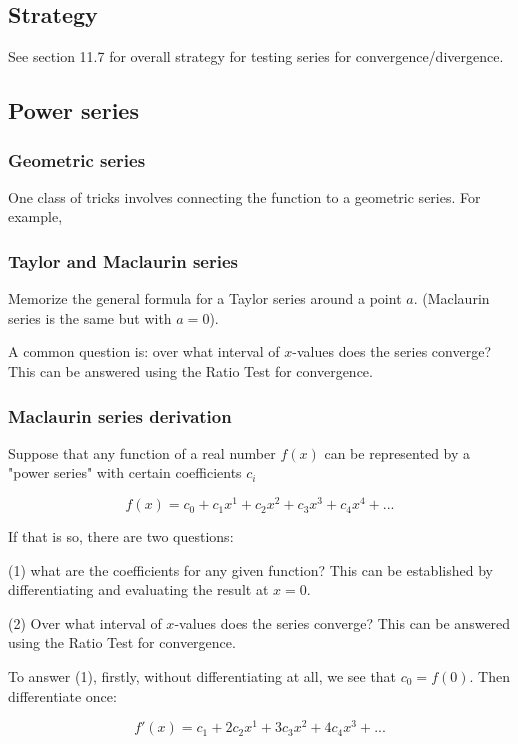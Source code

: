 \subsection{Strategy}

See section 11.7 for overall strategy for testing series for convergence/divergence.


\subsection{Power series}

\subsubsection{Geometric series}

One class of tricks involves connecting the function to a geometric series. For example,

\subsubsection{Taylor and Maclaurin series}

Memorize the general formula for a Taylor series around a point $a$. (Maclaurin series is the same but with $a=0$).

A common question is: over what interval of $x$-values does the series converge? This can be answered using the Ratio Test for convergence.

\subsubsection{Maclaurin series derivation}

Suppose that any function of a real number $f(x)$ can be represented by a "power series" with certain coefficients $c_i$

$$
f(x) = c_0 + c_1x^1 + c_2x^2 + c_3x^3 + c_4x^4 + ...
$$

If that is so, there are two questions:

(1) what are the coefficients for any given function? This can be established
by differentiating and evaluating the result at $x=0$.

(2) Over what interval of $x$-values does the series converge? This can be
answered using the Ratio Test for convergence.

To answer (1), firstly, without differentiating at all, we see that $c_0 = f(0)$. Then differentiate once:

$$
f'(x) = c_1 + 2c_2x^1 + 3c_3x^2 + 4c_4x^3 + ...
$$

